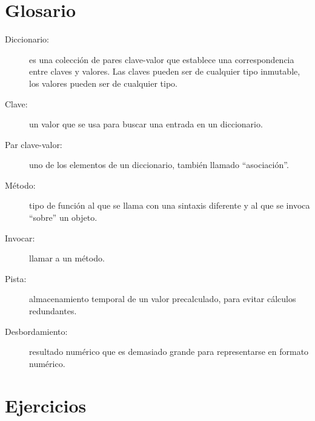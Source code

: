 \section{Glosario}
\begin{description}
\item [{Diccionario:}] es una colección de pares clave-valor que establece
una correspondencia entre claves y valores. Las claves pueden ser
de cualquier tipo inmutable, los valores pueden ser de cualquier tipo.
\item [{Clave:}] un valor que se usa para buscar una entrada en un diccionario.
\item [{Par clave-valor:}] uno de los elementos de un diccionario, también
llamado ``asociación''.
\item [{Método:}] tipo de función al que se llama con una sintaxis diferente
y al que se invoca ``sobre'' un objeto.
\item [{Invocar:}] llamar a un método.
\item [{Pista:}] almacenamiento temporal de un valor precalculado, para
evitar cálculos redundantes.
\item [{Desbordamiento:}] resultado numérico que es demasiado grande para
representarse en formato numérico.

   
 
\end{description}

\section{Ejercicios}


